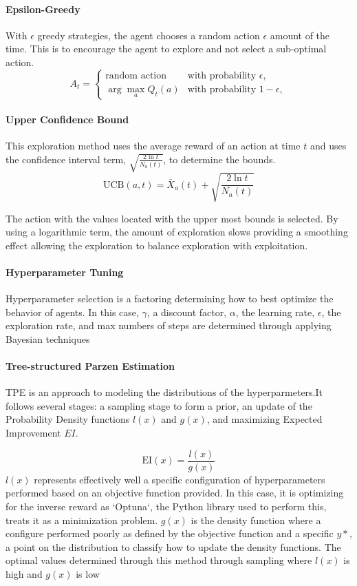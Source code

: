 \documentclass[conference]{IEEEtran}
\begin{document}
\paragraph{Epsilon-Greedy}
With $\epsilon$ greedy strategies, the agent chooses a random action  $\epsilon$ amount of the time. This is to encourage the agent to explore and not select a sub-optimal action. 
\[
A_t = 
\begin{cases} 
\text{random action} & \text{with probability } \epsilon, \\
\arg\max_a Q_t(a) & \text{with probability } 1 - \epsilon,
\end{cases}
\]
\paragraph{Upper Confidence Bound}

This exploration method uses the average reward of an action at time $t$ and uses the confidence interval term,  $\sqrt{\frac{2 \ln t}{N_a(t)}}$, to determine the bounds. 
\[
\text{UCB}(a, t) = \bar{X}_a(t) + \sqrt{\frac{2 \ln t}{N_a(t)}}
\]

The action with the values located with the upper most bounds is selected. By using a logarithmic term, the amount of exploration slows providing a smoothing effect allowing the exploration to balance exploration with exploitation. 

\paragraph{Hyperparameter Tuning}
Hyperparameter selection is a factoring determining how to best optimize the behavior of agents. In this case, $\gamma$, a discount factor, $\alpha$, the learning rate, $\epsilon$, the exploration rate, and max numbers of steps are determined through applying Bayesian techniques 

\paragraph{ Tree-structured Parzen Estimation}
TPE is an approach to modeling the distributions of the hyperparmeters.It follows several stages: a sampling stage to form a prior, an update of the Probability Density functions $l(x)$ and $g(x)$, and maximizing Expected Improvement $EI$.

\[
\text{EI}(x) = \frac{l(x)}{g(x)}
\]
$l(x)$ represents effectively well a specific configuration of hyperparameters performed based on an objective function provided. In this case, it is optimizing for the inverse reward  as `Optuna`, the Python library used to perform this, treats it as a minimization problem. $g(x)$ is the density function where a configure performed poorly as defined by the objective function and a specific $y*$, a point on the distribution to classify how to update the density functions. The optimal values determined through this method through sampling where $l(x)$ is high and $g(x)$ is low
\end{document}
